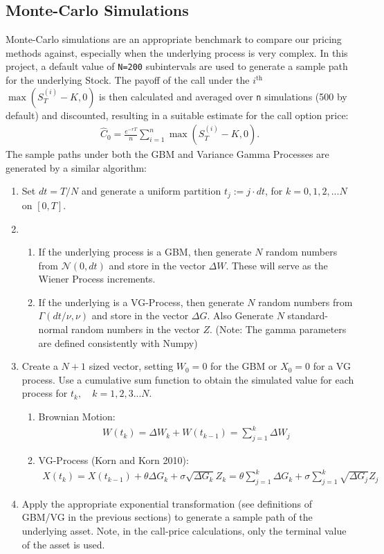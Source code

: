 \documentclass[11pt]{article}
\begin{document}
		\subsection{Monte-Carlo Simulations}
		Monte-Carlo simulations are an appropriate benchmark to compare our pricing methods against, especially when the underlying process is very complex. In this project, a default value of \texttt{N=200} subintervals are used to generate a sample path for the underlying Stock. The payoff of the call under the \( i^{\text{th}} \) \( \max\left(S^{(i)}_T - K, 0\right) \) is then calculated and averaged over \texttt{n} simulations (500 by default) and discounted, resulting in a suitable estimate for the call option price:
		\begin{align*}
			\hat{C}_{0} = \frac{e^{-rT}}{n}\sum_{i = 1}^{n}\max\left(S^{(i)}_{T} - K, 0\right).	
			\end{align*}
		The sample paths under both the GBM and Variance Gamma Processes are generated by a similar algorithm:
		\begin{enumerate}
			\item Set \( dt = T/N \) and generate a uniform partition \( t_j := j\cdot dt \), for \( k = 0, 1,2,...N \) on \( [0, T] \).
			\item \begin{enumerate}
				\item If the underlying process is a GBM, then generate \( N \) random numbers from \(\mathcal{N}(0, dt)  \) and store in the vector \( \Delta W \). These will serve as the Wiener Process increments.
				\item If the underlying is a VG-Process, then generate \( N \) random numbers from \( \Gamma(dt/\nu, \nu) \) and store in the vector \( \Delta G \). Also Generate \( N \) standard-normal random numbers in the vector \( Z \). (Note: The gamma parameters are defined consistently with Numpy)
			\end{enumerate}
			\item Create a \( N+1 \) sized vector, setting \( W_0 = 0 \) for the GBM or \( X_0 = 0 \) for a VG process. Use a cumulative sum function to obtain the simulated value for each process for \( t_k,\quad k=1,2,3...N \).
			\begin{enumerate}
				\item Brownian Motion:
				\begin{align*}
					W(t_k) = \Delta W_k + W(t_{k - 1}) = \sum_{j = 1}^{k}\Delta W_j
				\end{align*}
				\item VG-Process (Korn and Korn 2010):
				\begin{align*}
					X(t_k) = X(t_{k - 1}) + \theta \Delta G_{k} + \sigma \sqrt{\Delta G_{k}} Z_{k} = \theta\sum_{j = 1}^{k}\Delta G_{k} + \sigma\sum_{j = 1}^{k}\sqrt{\Delta G_{j}} Z_{j}
				\end{align*}
				\end{enumerate}
			\item Apply the appropriate exponential transformation (see definitions of GBM/VG in the previous sections) to generate a sample path of the underlying asset. Note, in the call-price calculations, only the terminal value of the asset is used. 
		\end{enumerate}
\end{document}
